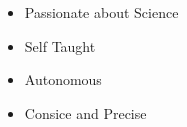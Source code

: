 %
%
%

\twocolumnsection
{
\begin{skills}
\end{skills}}
{
\vspace{1em}
\begin{itemize}
	\item Passionate about Science
	\item Self Taught                    
    	\item Autonomous
	\item Consice and Precise
\end{itemize}
}
